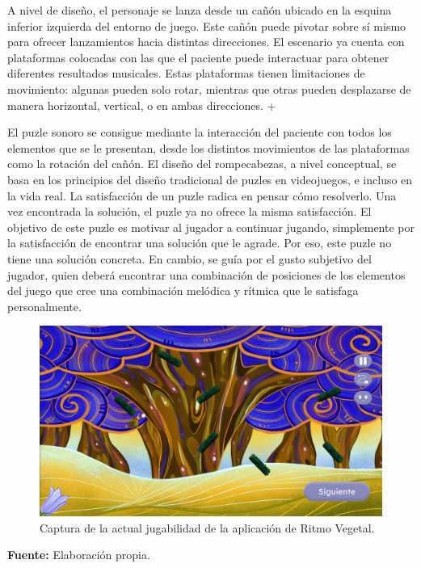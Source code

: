 A nivel de diseño, el personaje se lanza desde un cañón ubicado en la esquina inferior izquierda del entorno de juego. Este cañón puede pivotar sobre sí mismo para ofrecer lanzamientos hacia distintas direcciones. El escenario ya cuenta con plataformas colocadas con las que el paciente puede interactuar para obtener diferentes resultados musicales. Estas plataformas tienen limitaciones de movimiento: algunas pueden solo rotar, mientras que otras pueden desplazarse de manera horizontal, vertical, o en ambas direcciones. +

El puzle sonoro se consigue mediante la interacción del paciente con todos los elementos que se le presentan, desde los distintos movimientos de las plataformas como la rotación del cañón. El diseño del rompecabezas, a nivel conceptual, se basa en los principios del diseño tradicional de puzles en videojuegos, e incluso en la vida real. La satisfacción de un puzle radica en pensar cómo resolverlo. Una vez encontrada la solución, el puzle ya no ofrece la misma satisfacción. El objetivo de este puzle es motivar al jugador a continuar jugando, simplemente por la satisfacción de encontrar una solución que le agrade. Por eso, este puzle no tiene una solución concreta. En cambio, se guía por el gusto subjetivo del jugador, quien deberá encontrar una combinación de posiciones de los elementos del juego que cree una combinación melódica y rítmica que le satisfaga personalmente.

\begin{figure}[h!]
	\centering
	\includegraphics[width=0.9\linewidth]{Figuras/Desarrollo/RitmoVegetalGame.png}
	\caption{Captura de la actual jugabilidad de la aplicación de Ritmo Vegetal.}
	\label{fig:RitmoVegetal}
	\vspace{-25pt}
\end{figure}

\begin{center}
	\textbf{Fuente:} Elaboración propia.
\end{center}

